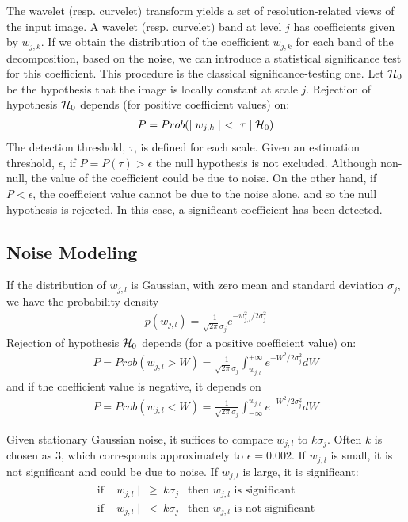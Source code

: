 The wavelet (resp. curvelet) transform yields a set of resolution-related views of the input image. 
A wavelet (resp. curvelet) band at level $j$ has coefficients given by $w_{j,k}$. If we obtain the 
distribution of the coefficient $w_{j,k}$ for each band of the decomposition, based on the noise, 
we can introduce a statistical significance test for this coefficient. This procedure is the classical 
significance-testing one. Let ${\cal H}_0$ be the hypothesis that the image is locally constant at scale $j$.  
Rejection of hypothesis ${\cal H}_0$ depends (for positive coefficient values) on:
\begin{eqnarray}
P = Prob(\mid w_{j,k} \mid \ < \ \tau \mid {\cal H}_0)  
\end{eqnarray}
The detection threshold, $\tau$, is defined for each scale. Given an estimation threshold, $\epsilon$, 
if $P = P(\tau) > \epsilon$ the null hypothesis is not excluded. Although non-null, the value of the 
coefficient could be due to noise. On the other hand, if $P < \epsilon$, the coefficient value cannot be due to 
the noise alone, and so the null hypothesis is rejected. In this case, a significant coefficient has been detected.

\subsection{Noise Modeling}
If the distribution of $w_{j,l}$ is Gaussian, with zero mean and standard deviation $\sigma_j$, we have the probability density
\begin{eqnarray}
p(w_{j,l}) = \frac{1}{\sqrt{2\pi} \sigma_j} e^{{- w_{j,l}^2}/2\sigma^2_j} 
\end{eqnarray}
Rejection of hypothesis ${\cal H}_0$ depends (for a positive coefficient value) on:
\begin{eqnarray}
P = Prob( w_{j,l} > W) = \frac{1}{\sqrt{2\pi} \sigma_j} \int^{+\infty}_{w_{j,l}} e^{-W^2/2\sigma^2_j} dW 
\end{eqnarray}
and if the coefficient value is negative, it depends on 
\begin{eqnarray}
P = Prob( w_{j,l} < W) = \frac{1}{\sqrt{2\pi} \sigma_j} \int^{w_{j,l}}_{-\infty} e^{-W^2/2\sigma^2_j} dW 
\end{eqnarray}

Given stationary Gaussian noise, it suffices to compare $w_{j,l}$ to 
$k \sigma_j$.  Often $k $ is chosen as 3, which corresponds approximately to $\epsilon = 0.002$.  
If $w_{j,l}$ is small, it is not significant and could be due to noise. If $w_{j,l}$ is large, it is significant:
\begin{eqnarray}
\begin{array}{l}
\mbox{ if }  \mid  w_{j,l} \mid \ \geq \ k \sigma_j \ \ \mbox{ then } w_{j,l}   \mbox{ is significant } \\ 
\mbox{ if }  \mid  w_{j,l} \mid \ < \ k \sigma_j \ \ \mbox{ then }  w_{j,l} \mbox{ is not significant }
\end{array}
\end{eqnarray}

